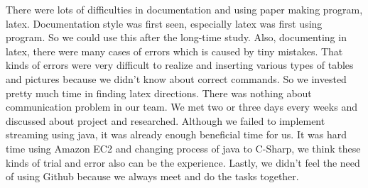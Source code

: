 \documentclass[12pt]{article}
\begin{document}
There were lots of difficulties in documentation and using paper making program, latex. Documentation style was first seen, especially latex was first using program. So we could use this after the long-time study. Also, documenting in latex, there were many cases of errors which is caused by tiny mistakes. That kinds of errors were very difficult to realize and inserting various types of tables and pictures because we didn't know about correct commands. So we invested pretty much time in finding latex directions. There was nothing about communication problem in our team. We met two or three days every weeks and discussed about project and researched. Although we failed to implement streaming using java, it was already enough beneficial time for us. It was hard time using Amazon EC2 and changing process of java to C-Sharp, we think these kinds of trial and error also can be the experience. Lastly, we didn't feel the need of using Github because we always meet and do the tasks together.\\
\end{document}
